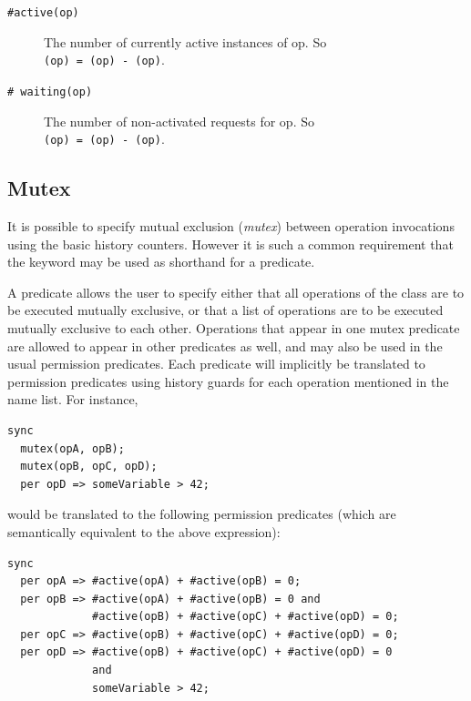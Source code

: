 \documentclass{overturerepchap}
\begin{document}
\begin{description}
\item[\texttt{\#active(op)}] The number of currently active instances
of op.  So \\ {\bf{}}\texttt{(op) = }{\bf{}}\texttt{(op) - }{\bf{}}\texttt{(op)}.
\item[\texttt{\# waiting(op)}] The number of non-activated requests for
op.  So \\ {\bf{}}\texttt{(op) = }{\bf{}}\texttt{(op) - }{\bf{}}\texttt{(op)}.
\end{description}

\subsection{Mutex}

It is possible to specify mutual exclusion (\emph{mutex}) between operation
invocations using the basic history counters. However it is such a
common requirement that the keyword {\bf{}} may be used as shorthand for
a {\bf{}} predicate.

A {\bf{}} predicate allows the user to specify either
that all operations of the class are to be executed mutually
exclusive, or that a list of operations are to be executed mutually
exclusive to each other. Operations that appear in one mutex predicate
are allowed to appear in other {\bf{}} predicates as
well, and may also be used in the usual permission predicates. Each
{\bf{}} predicate will implicitly be translated to
permission predicates using history guards for each operation
mentioned in the name list. For instance,

\begin{lstlisting}
sync
  mutex(opA, opB);
  mutex(opB, opC, opD);
  per opD => someVariable > 42;
\end{lstlisting}

\noindent
would be translated to the following permission predicates (which are
semantically equivalent to the above expression):

\begin{lstlisting}
sync
  per opA => #active(opA) + #active(opB) = 0;
  per opB => #active(opA) + #active(opB) = 0 and
             #active(opB) + #active(opC) + #active(opD) = 0;
  per opC => #active(opB) + #active(opC) + #active(opD) = 0;
  per opD => #active(opB) + #active(opC) + #active(opD) = 0 
             and
             someVariable > 42;
\end{lstlisting}
\end{document}
